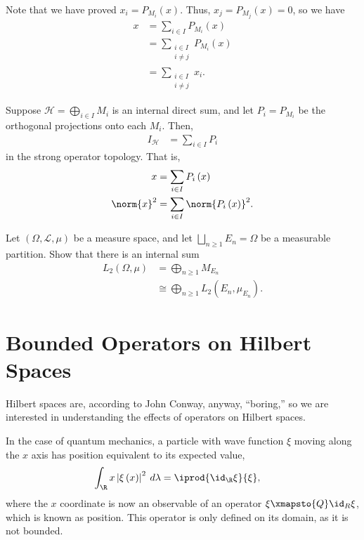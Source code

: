 \documentclass[10pt]{mypackage}
\begin{document}
\begin{solution}
  Note that we have proved $x_i = P_{M_i}\left(x\right)$. Thus, $x_j = P_{M_j}\left(x\right) = 0$, so we have
  \begin{align*}
    x &= \sum_{i\in I}P_{M_i}\left(x\right)\\
      &= \sum_{\substack{i\in I\\i\neq j}}P_{M_i}\left(x\right)\\
      &= \sum_{\substack{i\in I\\i\neq j}}x_i.
  \end{align*}
\end{solution}
\begin{corollary}
  Suppose $\mathcal{H}=\bigoplus_{i\in I}M_i$ is an internal direct sum, and let $P_i = P_{M_i}$ be the orthogonal projections onto each $M_i$. Then,
  \begin{align*}
    I_{\mathcal{H}} &= \sum_{i\in I}P_{i}
  \end{align*}
  in the strong operator topology. That is,
  \begin{align*}
    x &= \sum_{i\in I}P_i\left(x\right)\\
    \norm{x}^2 &= \sum_{i\in I}\norm{P_i\left(x\right)}^2.
  \end{align*}
\end{corollary}
\begin{exercise}
  Let $\left(\Omega,\mathcal{L},\mu\right)$ be a measure space, and let $\bigsqcup_{n\geq 1}E_n = \Omega$ be a measurable partition. Show that there is an internal sum
  \begin{align*}
    L_2\left(\Omega,\mu\right) &= \bigoplus_{n\geq 1}M_{E_n}\\
                               &\cong \bigoplus_{n\geq 1}L_{2}\left(E_n,\mu_{E_n}\right).
  \end{align*}
\end{exercise}

\section{Bounded Operators on Hilbert Spaces}%
Hilbert spaces are, according to John Conway, anyway, ``boring,'' so we are interested in understanding the effects of operators on Hilbert spaces.\newline

In the case of quantum mechanics, a particle with wave function $\xi$ moving along the $x$ axis has position equivalent to its expected value,
\begin{align*}
  \int_{\R}^{} x \left\vert \xi\left(x\right) \right\vert^2\:d\lambda &= \iprod{\id_{\R} \xi}{\xi},
\end{align*}
where the $x$ coordinate is now an observable of an operator $\xi\xmapsto{Q} \id_{R}\xi$, which is known as position. This operator is only defined on its domain, as it is not bounded.\newline
\end{document}
